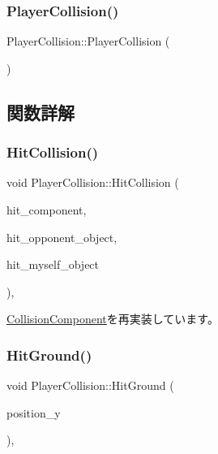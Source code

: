 \subsubsection{\texorpdfstring{Player\+Collision()}{PlayerCollision()}}
{\footnotesize\ttfamily Player\+Collision\+::\+Player\+Collision (\begin{DoxyParamCaption}{ }\end{DoxyParamCaption})}



\subsection{関数詳解}
\mbox{\label{class_player_collision_ae2d429a16bf2c3ee74070ef497a8696a}} 
\subsubsection{\texorpdfstring{Hit\+Collision()}{HitCollision()}}
{\footnotesize\ttfamily void Player\+Collision\+::\+Hit\+Collision (\begin{DoxyParamCaption}\item[{\mbox{\hyperlink{class_collision_component}{Collision\+Component}} $\ast$}]{hit\+\_\+component,  }\item[{\mbox{\hyperlink{class_collision_object}{Collision\+Object}} $\ast$}]{hit\+\_\+opponent\+\_\+object,  }\item[{\mbox{\hyperlink{class_collision_object}{Collision\+Object}} $\ast$}]{hit\+\_\+myself\+\_\+object }\end{DoxyParamCaption})\hspace{0.3cm}{\ttfamily [override]}, {\ttfamily [virtual]}}



\mbox{\hyperlink{class_collision_component_a50c4fea9d37eb22ac435ee5c2ce36254}{Collision\+Component}}を再実装しています。

\mbox{\label{class_player_collision_a3522ce17b1e1752f2737c2243582ecb0}} 
\subsubsection{\texorpdfstring{Hit\+Ground()}{HitGround()}}
{\footnotesize\ttfamily void Player\+Collision\+::\+Hit\+Ground (\begin{DoxyParamCaption}\item[{float}]{position\+\_\+y }\end{DoxyParamCaption})\hspace{0.3cm}{\ttfamily [override]}, {\ttfamily [virtual]}}



